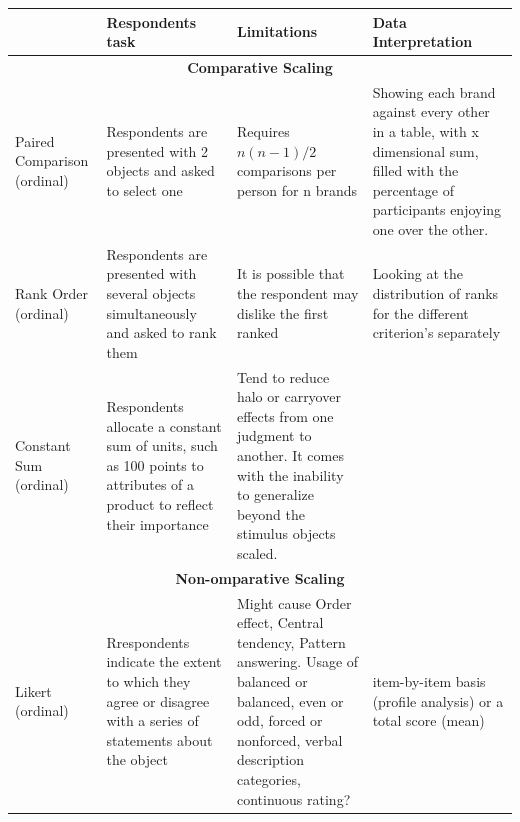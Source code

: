 \documentclass[11pt]{article}
\begin{document}
    \begin{tabular}{  p{1.5cm}  p{3cm}  p{3cm}  p{3cm}  }
        &  \textbf{Respondents task} & \textbf{Limitations} & \textbf{Data Interpretation} \\
        \hline
        \multicolumn{4}{c}{\textbf{Comparative Scaling}} \\
        \hline
        Paired Comparison \newline (ordinal) &
        Respondents are presented with 2 objects and asked to select one &
        Requires $n(n-1)/2$ comparisons per person for n brands &
        Showing each brand against every other in a table, with x dimensional sum, filled with the percentage of participants enjoying one over the other.  \newline \\

        Rank Order \newline (ordinal) &
        Respondents are presented with several objects simultaneously and asked to rank them  \newline &
        It is possible that the respondent may dislike the first ranked &
        Looking at the distribution of ranks for the different criterion's separately \\

        Constant Sum \newline (ordinal) &
        Respondents allocate a constant sum of units, such as 100 points to attributes of a product to reflect their importance &
        Tend to reduce halo or carryover effects from one judgment to another. It comes with the inability to generalize beyond the stimulus objects scaled. \newline &
        \\

        \hline
        \multicolumn{4}{c}{\textbf{Non-omparative Scaling}} \\
        \hline
        Likert \newline (ordinal) &
        Rrespondents indicate the extent to which they agree or disagree with a series of statements about the object &
        Might cause Order effect, Central tendency, Pattern answering. Usage of balanced or balanced, even or odd, forced or nonforced, verbal description categories, continuous rating? \newline &
        item-by-item basis (profile analysis) or a total score (mean) \\

    \end{tabular}
\end{document}
